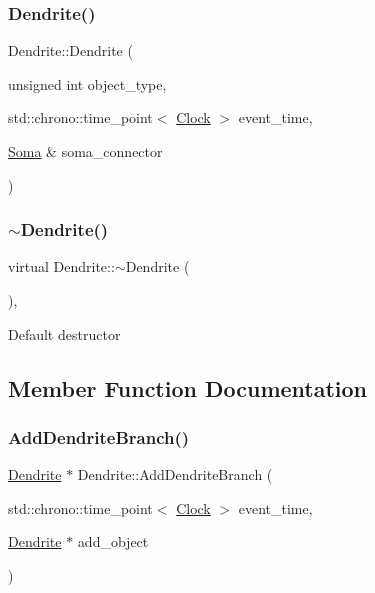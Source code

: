 \mbox{\label{classDendrite_ac358d84fb75919386aced214fa0e1107}} 
\subsubsection{\texorpdfstring{Dendrite()}{Dendrite()}\hspace{0.1cm}{\footnotesize\ttfamily [4/4]}}
{\footnotesize\ttfamily Dendrite\+::\+Dendrite (\begin{DoxyParamCaption}\item[{unsigned int}]{object\+\_\+type,  }\item[{std\+::chrono\+::time\+\_\+point$<$ \mbox{\hyperlink{universe_8h_a0ef8d951d1ca5ab3cfaf7ab4c7a6fd80}{Clock}} $>$}]{event\+\_\+time,  }\item[{\mbox{\hyperlink{classSoma}{Soma}} \&}]{soma\+\_\+connector }\end{DoxyParamCaption})\hspace{0.3cm}{\ttfamily [inline]}}

\mbox{\label{classDendrite_a616c3f82655d8a3cf9cebc22e7aa2233}} 
\subsubsection{\texorpdfstring{$\sim$\+Dendrite()}{~Dendrite()}}
{\footnotesize\ttfamily virtual Dendrite\+::$\sim$\+Dendrite (\begin{DoxyParamCaption}{ }\end{DoxyParamCaption})\hspace{0.3cm}{\ttfamily [inline]}, {\ttfamily [virtual]}}

Default destructor 

\subsection{Member Function Documentation}
\mbox{\label{classDendrite_aab6cedff35cb8c65923b14c8034cccc0}} 
\subsubsection{\texorpdfstring{Add\+Dendrite\+Branch()}{AddDendriteBranch()}}
{\footnotesize\ttfamily \mbox{\hyperlink{classDendrite}{Dendrite}} $\ast$ Dendrite\+::\+Add\+Dendrite\+Branch (\begin{DoxyParamCaption}\item[{std\+::chrono\+::time\+\_\+point$<$ \mbox{\hyperlink{universe_8h_a0ef8d951d1ca5ab3cfaf7ab4c7a6fd80}{Clock}} $>$}]{event\+\_\+time,  }\item[{\mbox{\hyperlink{classDendrite}{Dendrite}} $\ast$}]{add\+\_\+object }\end{DoxyParamCaption})}

